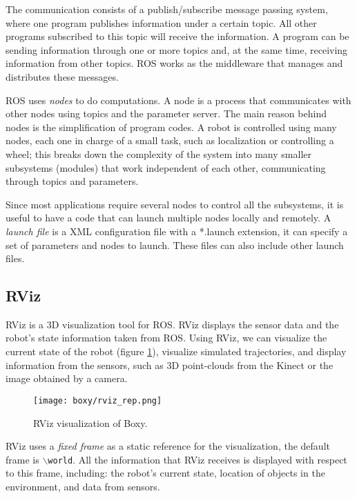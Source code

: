 The communication consists of a publish/subscribe message passing system, where one program publishes information under a certain topic. All other programs subscribed to this topic will receive the information. A program can be sending information through one or more topics and, at the same time, receiving information from other topics. ROS works as the middleware that manages and distributes these messages.

ROS uses \textit{nodes} to do computations. A node is a process that communicates with other nodes using topics and the parameter server. The main reason behind nodes is the simplification of program codes. A robot is controlled using many nodes, each one in charge of a small task, such as localization or controlling a wheel; this breaks down the complexity of the system into many smaller subsystems (modules) that work independent of each other, communicating through topics and parameters.

Since most applications require several nodes to control all the subsystems, it is useful to have a code that can launch multiple nodes locally and remotely. A \textit{launch file} is a XML configuration file with a *.launch extension, it can specify a set of parameters and nodes to launch. These files can also include other launch files. 


\subsection{RViz}
\label{subsec:rviz}

RViz is a 3D visualization tool for ROS. RViz displays the sensor data and the robot's state information taken from ROS. Using RViz, we can visualize the current state of the robot (figure \ref{fig:rviz}), visualize simulated trajectories, and display information from the sensors, such as 3D point-clouds from the Kinect or the image obtained by a camera.

\begin{figure}[H]
	\centering
	\texttt{[image: boxy/rviz\_rep.png]}
	\vspace{-10pt}
	\caption{RViz visualization of Boxy.}
	\vspace{-15pt}
	\label{fig:rviz}
\end{figure}

RViz uses a \textit{fixed frame} as a static reference for the visualization, the default frame is  \texttt{$\backslash$world}. All the information that RViz receives is displayed with respect to this frame, including: the robot's current state, location of objects in the environment, and data from sensors.

